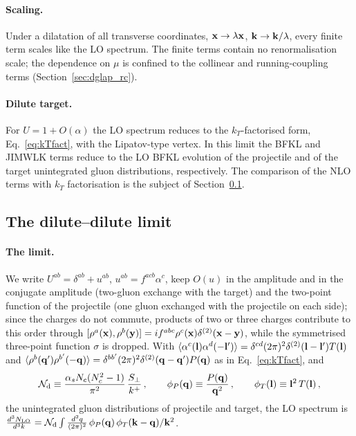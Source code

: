 \paragraph{Scaling.} Under a dilatation of all transverse coordinates, $\mathbf{x}\to\lambda\mathbf{x}$, $\mathbf{k}\to\mathbf{k}/\lambda$, every finite term scales like the LO spectrum. The finite terms contain no renormalisation scale; the dependence on $\mu$ is confined to the collinear and running-coupling terms (Section~\ref{sec:dglap_rc}).

\paragraph{Dilute target.} For $U=1+O(\alpha)$ the LO spectrum reduces to the $k_T$-factorised form, Eq.~\eqref{eq:kTfact}, with the Lipatov-type vertex. In this limit the BFKL and JIMWLK terms reduce to the LO BFKL evolution of the projectile and of the target unintegrated gluon distributions, respectively. The comparison of the NLO terms with $k_T$ factorisation is the subject of Section~\ref{sec:check_dilute}.

\subsection{The dilute--dilute limit}\label{sec:check_dilute}

\paragraph{The limit.} We write $U^{ab}=\delta^{ab}+u^{ab}$, $u^{ab}=f^{acb}\alpha^c$, keep $O(u)$ in the amplitude and in the conjugate amplitude (two-gluon exchange with the target) and the two-point function of the projectile (one gluon exchanged with the projectile on each side); since the charges do not commute, products of two or three charges contribute to this order through $[\rho^a(\mathbf{x}),\rho^b(\mathbf{y})]=if^{abc}\rho^c(\mathbf{x})\delta^{(2)}(\mathbf{x}-\mathbf{y})$, while the symmetrised three-point function $\sigma$ is dropped. With $\langle\alpha^c(\mathbf{l})\alpha^d(-\mathbf{l}')\rangle=\delta^{cd}(2\pi)^2\delta^{(2)}(\mathbf{l}-\mathbf{l}')T(\mathbf{l})$ and $\langle\rho^b(\mathbf{q}')\rho^{b'}(-\mathbf{q})\rangle=\delta^{bb'}(2\pi)^2\delta^{(2)}(\mathbf{q}-\mathbf{q}')P(\mathbf{q})$ as in Eq.~\eqref{eq:kTfact}, and
\begin{align}\label{eq:dilute_not}
\mathcal N_{\rm d}\equiv\frac{\alpha_sN_c(N_c^2-1)}{\pi^2}\,\frac{S_\perp}{k^+}\,,\qquad\phi_P(\mathbf{q})\equiv\frac{P(\mathbf{q})}{\mathbf{q}^2}\,,\qquad\phi_T(\mathbf{l})\equiv\mathbf{l}^2\,T(\mathbf{l})\,,
\end{align}
the unintegrated gluon distributions of projectile and target, the LO spectrum is $\frac{d^3N_{\rm LO}}{d^3k}=\mathcal N_{\rm d}\int\frac{d^2q}{(2\pi)^2}\,\phi_P(\mathbf{q})\,\phi_T(\mathbf{k}-\mathbf{q})/\mathbf{k}^2$.

